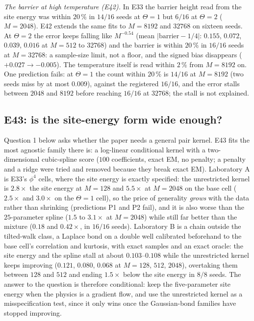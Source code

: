 \documentclass[10pt,a4paper]{article}
\theoremstyle{plain}
\theoremstyle{remark}
\begin{document}
\emph{The barrier at high temperature (E42).} In E33 the barrier height read from the site energy was within $20\,\%$ in $14/16$ seeds at $\Theta=1$ but $6/16$ at $\Theta=2$ ($M=2048$). E42 extends the same fits to $M=8192$ and $32768$ on sixteen seeds. At $\Theta=2$ the error keeps falling
like $M^{-0.54}$ (mean $|\text{barrier}-1/4|$: $0.155$, $0.072$, $0.039$, $0.016$ at $M=512$ to $32768$) and the barrier is within $20\,\%$ in $16/16$ seeds at $M=32768$: a sample-size limit, not a floor, and the signed bias disappears ($+0.027\to-0.005$). The temperature itself is read within $2\,\%$ from $M=8192$ on. One prediction fails: at $\Theta=1$ the count within $20\,\%$ is
$14/16$ at $M=8192$ (two seeds miss by at most $0.009$), against the registered $16/16$, and the error stalls between $2048$ and $8192$ before reaching $16/16$ at $32768$; the stall is not explained.

\subsection{E43: is the site-energy form wide enough?}

Question 1 below asks whether the paper needs a general pair kernel. E43 fits the most agnostic family there is: a log-linear conditional kernel with a two-dimensional cubic-spline score ($100$ coefficients, exact EM, no penalty; a penalty and a ridge were tried and removed because they break exact EM).
Laboratory A is E33's $\phi^4$ cells, where the site energy is exactly specified: the unrestricted kernel is $2.8\times$ the site energy at $M=128$ and $5.5\times$ at $M=2048$ on the base cell ($2.5\times$ and $3.0\times$ on the $\Theta=1$ cell), so the price of generality \emph{grows} with the data rather than shrinking (predictions P1 and P2 fail),
and it is also worse than the $25$-parameter spline ($1.5$ to $3.1\times$ at $M=2048$) while still far better than the mixture ($0.18$ and $0.42\times$, in $16/16$ seeds). Laboratory B is a chain outside the tilted-walk class, a Laplace bond on a double well calibrated beforehand to the base cell's correlation and kurtosis, with exact samples and an exact oracle:
the site energy and the spline stall at about $0.103$--$0.108$ while the unrestricted kernel keeps improving ($0.121$, $0.080$, $0.068$ at $M=128$, $512$, $2048$), overtaking them between $128$ and $512$ and ending $1.5\times$ below the site energy in $8/8$ seeds. The answer to the question is therefore conditional: keep the five-parameter site energy when the physics is a gradient flow,
and use the unrestricted kernel as a misspecification test, since it only wins once the Gaussian-bond families have stopped improving.
\end{document}
